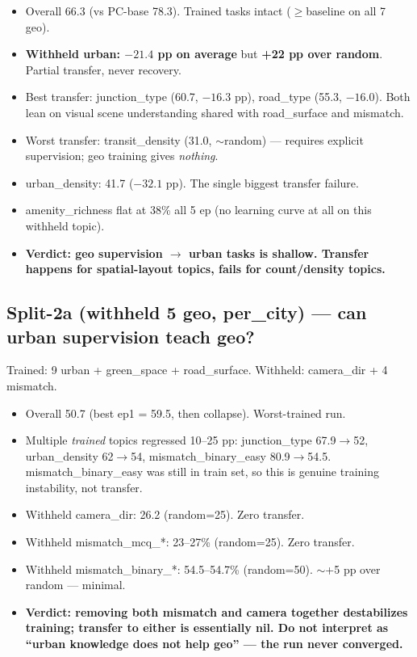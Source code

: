 \documentclass[11pt]{article}
\begin{document}
\begin{itemize}\itemsep1pt
\item Overall 66.3 (vs PC-base 78.3). Trained tasks intact ($\geq$baseline on all 7 geo).
\item \textbf{Withheld urban: $-21.4$ pp on average} but \textbf{+22 pp over random}. Partial transfer, never recovery.
\item Best transfer: junction\_type (60.7, $-16.3$ pp), road\_type (55.3, $-16.0$). Both lean on visual scene understanding shared with road\_surface and mismatch.
\item Worst transfer: transit\_density (31.0, $\sim$random) --- requires explicit supervision; geo training gives \emph{nothing}.
\item urban\_density: 41.7 ($-32.1$ pp). The single biggest transfer failure.
\item amenity\_richness flat at 38\% all 5 ep (no learning curve at all on this withheld topic).
\item \textbf{Verdict: geo supervision $\to$ urban tasks is shallow. Transfer happens for spatial-layout topics, fails for count/density topics.}
\end{itemize}

\subsection*{Split-2a (withheld 5 geo, per\_city) --- can urban supervision teach geo?}

Trained: 9 urban + green\_space + road\_surface. Withheld: camera\_dir + 4 mismatch.

\begin{itemize}\itemsep1pt
\item Overall 50.7 (best ep1 = 59.5, then collapse). Worst-trained run.
\item Multiple \emph{trained} topics regressed 10--25 pp: junction\_type 67.9$\to$52, urban\_density 62$\to$54, mismatch\_binary\_easy 80.9$\to$54.5. mismatch\_binary\_easy was still in train set, so this is genuine training instability, not transfer.
\item Withheld camera\_dir: 26.2 (random=25). Zero transfer.
\item Withheld mismatch\_mcq\_*: 23--27\% (random=25). Zero transfer.
\item Withheld mismatch\_binary\_*: 54.5--54.7\% (random=50). $\sim$+5 pp over random --- minimal.
\item \textbf{Verdict: removing both mismatch and camera together destabilizes training; transfer to either is essentially nil. Do not interpret as ``urban knowledge does not help geo'' --- the run never converged.}
\end{itemize}
\end{document}
